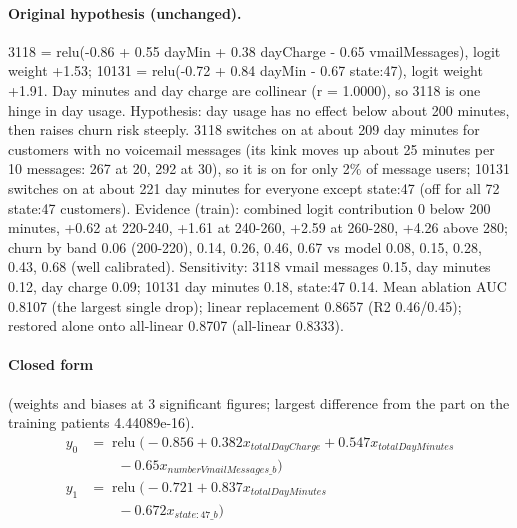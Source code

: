 \documentclass[a4paper,10pt]{article}
\newif\ifreviewmarks
\newcommand{\reviewrule}{\noindent{\color{BrickRed}\rule{\linewidth}{0.8pt}}}
\newenvironment{drafted}[1][]{%
  \ifreviewmarks\par\addvspace{\medskipamount}\reviewrule\par\nopagebreak
  \noindent{\color{BrickRed}\sffamily\footnotesize\textbf{Thesis Draft}\quad #1\hfill review}\par\nopagebreak\smallskip\fi}{%
  \ifreviewmarks\par\smallskip\noindent{\color{BrickRed}\sffamily\footnotesize end of thesis draft}\par\nopagebreak\reviewrule\par\medskip\fi}
\begin{document}
\begin{drafted}[plain-language layer: churn100-s4-c2]
\paragraph{Original hypothesis (unchanged).} 3118 = relu(-0.86 + 0.55 dayMin + 0.38 dayCharge - 0.65 vmailMessages), logit weight +1.53; 10131 = relu(-0.72 + 0.84 dayMin - 0.67 state:47), logit weight +1.91. Day minutes and day charge are collinear (r = 1.0000), so 3118 is one hinge in day usage. Hypothesis: day usage has no effect below about 200 minutes, then raises churn risk steeply. 3118 switches on at about 209 day minutes for customers with no voicemail messages (its kink moves up about 25 minutes per 10 messages: 267 at 20, 292 at 30), so it is on for only 2\% of message users; 10131 switches on at about 221 day minutes for everyone except state:47 (off for all 72 state:47 customers). Evidence (train): combined logit contribution 0 below 200 minutes, +0.62 at 220-240, +1.61 at 240-260, +2.59 at 260-280, +4.26 above 280; churn by band 0.06 (200-220), 0.14, 0.26, 0.46, 0.67 vs model 0.08, 0.15, 0.28, 0.43, 0.68 (well calibrated). Sensitivity: 3118 vmail messages 0.15, day minutes 0.12, day charge 0.09; 10131 day minutes 0.18, state:47 0.14. Mean ablation AUC 0.8107 (the largest single drop); linear replacement 0.8657 (R2 0.46/0.45); restored alone onto all-linear 0.8707 (all-linear 0.8333).
\paragraph{Closed form} {\footnotesize(weights and biases at 3 significant figures; largest difference from the part on the training patients 4.44089e-16).}
{\small\begingroup\allowdisplaybreaks
\begin{align*}
y_{0} &= \operatorname{relu}\bigl(-0.856 + 0.382 x_{totalDayCharge} + 0.547 x_{totalDayMinutes} \\
&\qquad - 0.65 x_{numberVmailMessages\_b}\bigr) \\
y_{1} &= \operatorname{relu}\bigl(-0.721 + 0.837 x_{totalDayMinutes} \\
&\qquad - 0.672 x_{state:47\_b}\bigr)
\end{align*}\endgroup}


\end{drafted}
\end{document}
